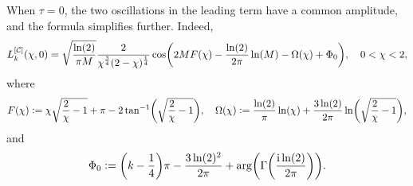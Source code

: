 When $\tau=0$, the two oscillations in the leading term have a common amplitude, and the formula simplifies further.  Indeed,
\begin{equation}
L_k^{[\channels]}(\chi,0)=\sqrt{\frac{\ln(2)}{\pi M}}\frac{2}{\chi^\frac{3}{4}(2-\chi)^\frac{1}{4}}\cos\left(2MF(\chi)-\frac{\ln(2)}{2\pi}\ln(M)-\Omega(\chi)+\Phi_0\right),\quad 0<\chi<2,
\label{eq:leading-term-channels-tau-zero}
\end{equation}
where
\begin{equation}
F(\chi)\defeq\chi\sqrt{\frac{2}{\chi}-1}+\pi-2\tan^{-1}\left(\sqrt{\frac{2}{\chi}-1}\right),\quad
\Omega(\chi)\defeq\frac{\ln(2)}{\pi}\ln(\chi)+\frac{3\ln(2)}{2\pi}\ln\left(\sqrt{\frac{2}{\chi}-1}\right),
\end{equation}
and
\begin{equation}
\Phi_0\defeq\left(k-\frac{1}{4}\right)\pi-\frac{3\ln(2)^2}{2\pi}+\arg\left(\Gamma\left(\frac{\ii\ln(2)}{2\pi}\right)\right).
\label{eq:leading-term-channels-tau-zero-last}
\end{equation}

